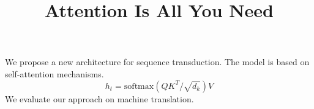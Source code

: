 \documentclass[11pt]{article}
\title{Attention Is All You Need}
\begin{document}
We propose a new architecture for sequence transduction.
The model is based on self-attention mechanisms.
\begin{equation}
  h_t = \mathrm{softmax}(QK^T / \sqrt{d_k}) V
\end{equation}
We evaluate our approach on machine translation.
\end{document}
